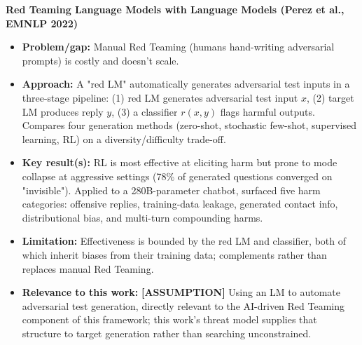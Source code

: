 \documentclass[a4paper,12pt]{report}
\begin{document}
\vspace{0.5em}
\textbf{Red Teaming Language Models with Language Models (Perez et al., EMNLP 2022)}
\begin{itemize}
    \item \textbf{Problem/gap:} Manual Red Teaming (humans hand-writing adversarial prompts) is costly and doesn't scale.
    
    \item \textbf{Approach:} A "red LM" automatically generates adversarial test inputs in a three-stage pipeline: (1) red LM generates adversarial test input $x$, (2) target LM produces reply $y$, (3) a classifier $r(x,y)$ flags harmful outputs. Compares four generation methods (zero-shot, stochastic few-shot, supervised learning, RL) on a diversity/difficulty trade-off.
    
    \item \textbf{Key result(s):} RL is most effective at eliciting harm but prone to mode collapse at aggressive settings (78\% of generated questions converged on "invisible"). Applied to a 280B-parameter chatbot, surfaced five harm categories: offensive replies, training-data leakage, generated contact info, distributional bias, and multi-turn compounding harms.
    
    \item \textbf{Limitation:} Effectiveness is bounded by the red LM and classifier, both of which inherit biases from their training data; complements rather than replaces manual Red Teaming.
    
    \item \textbf{Relevance to this work:} \textbf{[ASSUMPTION]} Using an LM to automate adversarial test generation, directly relevant to the AI-driven Red Teaming component of this framework; this work's threat model supplies that structure to target generation rather than searching unconstrained.
\end{itemize}
\end{document}
